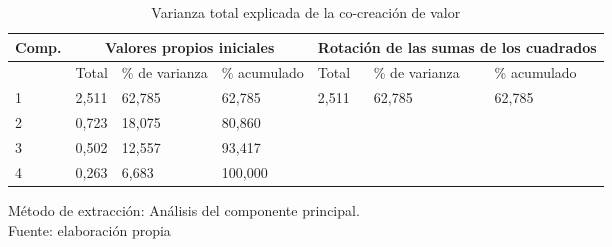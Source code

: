 \begin{table}[h]
    \caption {Varianza total explicada de la co-creación de valor}
	\label{tab:varianzaExplicada2}
	\setlength\extrarowheight{5pt}
	
	\begin{tabular}{p{1.5cm} p{1.9cm} p{1.7cm} p{1.7cm} p{1.9cm} p{1.9cm} p{1.7cm}}
	\toprule
	Comp.	& \multicolumn{3}{c}{Valores propios iniciales} & \multicolumn{3}{c}{Rotación de las sumas de los cuadrados} \\
	\midrule
		& Total	& \% de varianza	& \% acumulado	& Total	& \% de varianza 	& \% acumulado \\
	\midrule
	1	& 2,511	& 62,785	& 62,785	& 2,511	& 62,785	& 62,785 \\
	2	& 0,723	& 18,075	& 80,860	& 	& 	&  \\
	3	& 0,502	& 12,557	& 93,417	& 	& 	&  \\
	4	& 0,263	& 6,683		& 100,000	& 	& 	&  \\
	\bottomrule
	\end{tabular}
	
	\center
	\footnotesize
	Método de extracción: Análisis del componente principal.\\
	Fuente: elaboración propia
\end{table}
